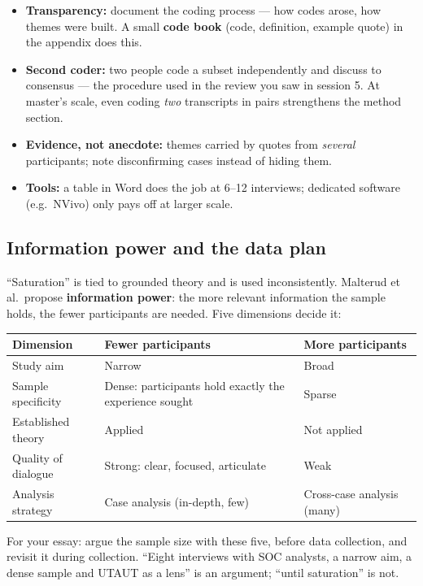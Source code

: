 \documentclass[11pt,a4paper,british,twoside=false,headings=small,chapterprefix=false,numbers=noenddot]{scrbook}
\begin{document}
\begin{center}\small
\begin{itemize}\setlength{\itemsep}{0.45em}
    \item \textbf{Transparency:} document the coding process --- how codes
          arose, how themes were built. A small \textbf{code book} (code,
          definition, example quote) in the appendix does this.
    \item \textbf{Second coder:} two people code a subset independently and
          discuss to consensus --- the procedure used in the review you saw
          in session 5. At master's scale, even coding \emph{two} transcripts in
          pairs strengthens the method section.
    \item \textbf{Evidence, not anecdote:} themes carried by quotes from
          \emph{several} participants; note disconfirming cases instead of
          hiding them.
    \item \textbf{Tools:} a table in Word does the job at 6--12 interviews;
          dedicated software (e.g.\ NVivo) only pays off at larger scale.
  \end{itemize}
\end{center}


\subsection{Information power and the data plan}
\begin{center}\small
\small ``Saturation'' is tied to grounded theory and is used inconsistently.
  Malterud et al.\ propose \textbf{information power}: the more relevant
  information the sample holds, the fewer participants are needed. Five
  dimensions decide it:
  
  \footnotesize
  \renewcommand{\arraystretch}{1.15}
  \begin{tabular}{@{}p{3.4cm}p{4.6cm}p{4.6cm}@{}}
    \toprule
    \textbf{Dimension} & \textbf{Fewer participants} & \textbf{More participants}\\
    \midrule
    Study aim & Narrow & Broad\\
    Sample specificity & Dense: participants hold exactly the experience sought & Sparse\\
    Established theory & Applied & Not applied\\
    Quality of dialogue & Strong: clear, focused, articulate & Weak\\
    Analysis strategy & Case analysis (in-depth, few) & Cross-case analysis (many)\\
    \bottomrule
  \end{tabular}
  

  \small For your essay: argue the sample size with these five, before data
  collection, and revisit it during collection. ``Eight interviews with SOC
  analysts, a narrow aim, a dense sample and UTAUT as a lens'' is an argument;
  ``until saturation'' is not.
\end{center}
\end{document}

